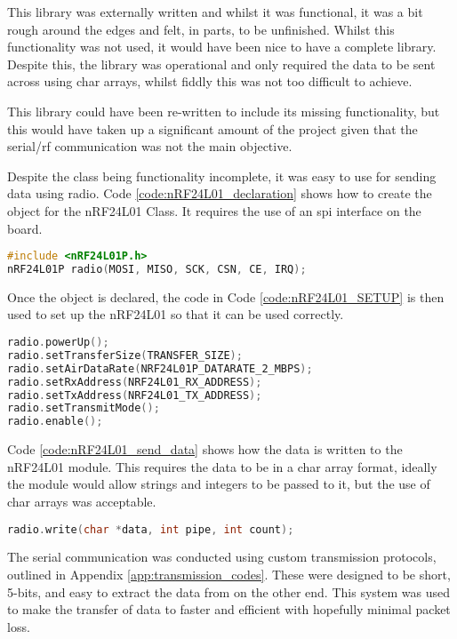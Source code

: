 \documentclass [12pt]{article}
\begin{document}
This library was externally written and whilst it was functional, it was a bit rough around the edges and felt, in parts, to be unfinished. Whilst this functionality was not used, it would have been nice to have a complete library. Despite this, the library was operational and only required the data to be sent across using char arrays, whilst fiddly this was not too difficult to achieve. 

This library could have been re-written to include its missing functionality, but this would have taken up a significant amount of the project given that the serial/\gls{rf} communication was not the main objective.     

Despite the class being functionality incomplete, it was easy to use for sending data using radio. Code \ref{code:nRF24L01_declaration} shows how to create the object for the nRF24L01 Class. It requires the use of an \gls{spi} interface on the board.  

\begin{lstlisting}[language=C++,label=code:nRF24L01_declaration,caption=nRF24L01 Class Constructor]
#include <nRF24L01P.h>
nRF24L01P radio(MOSI, MISO, SCK, CSN, CE, IRQ);
\end{lstlisting}

Once the object is declared, the code in Code \ref{code:nRF24L01_SETUP} is then used to set up the nRF24L01 so that it can be used correctly. 

\begin{lstlisting}[language=C++,label=code:nRF24L01_SETUP,caption=nRF24L01 Set Up Transmit Mode]
radio.powerUp();
radio.setTransferSize(TRANSFER_SIZE);
radio.setAirDataRate(NRF24L01P_DATARATE_2_MBPS);
radio.setRxAddress(NRF24L01_RX_ADDRESS);
radio.setTxAddress(NRF24L01_TX_ADDRESS);
radio.setTransmitMode();
radio.enable();
\end{lstlisting}

Code \ref{code:nRF24L01_send_data} shows how the data is written to the nRF24L01 module. This requires the data to be in a char array format, ideally the module would allow strings and integers to be passed to it, but the use of char arrays was acceptable.

\begin{lstlisting}[language=C++,label=code:nRF24L01_send_data,caption=Sending Data Using nRF24L01]
radio.write(char *data, int pipe, int count);
\end{lstlisting}

The serial communication was conducted using custom transmission protocols, outlined in Appendix \ref{app:transmission_codes}. These were designed to be short, 5-bits, and easy to extract the data from on the other end. This system was used to make the transfer of  data to faster and efficient with hopefully minimal packet loss.
\end{document}
